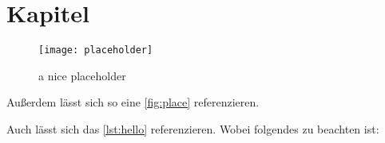 \chapter{Kapitel}\label{sec:kaptiel}

\blindtext

\begin{figure}[h]
    \centering
    \texttt{[image: placeholder]}
    \caption{a nice placeholder}
    \label{fig:place}
\end{figure}

\blindtext
Außerdem lässt sich so eine \autoref{fig:place} referenzieren\cite{dreyfus:1980}.

\begin{minipage}[c]{\textwidth}
    
\end{minipage}

Auch lässt sich das \autoref{lst:hello} referenzieren.
Wobei folgendes zu beachten ist:
\blindtext

